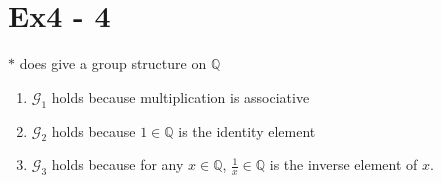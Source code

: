 \section*{Ex4 - 4}
$ * $ does give a group structure on $ \mathbb{Q} $
\begin{enumerate}
    \item {$ \mathscr{G}_1 $ holds because multiplication is associative}
    \item {$ \mathscr{G}_2 $ holds because $ 1 \in \mathbb{Q} $ is the identity element}
    \item {$ \mathscr{G}_3 $ holds because for any $ x \in \mathbb{Q} $, $ \frac{1}{x} \in \mathbb{Q} $ is the inverse element of $ x $.}
\end{enumerate}